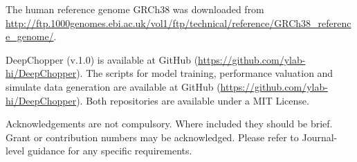 \documentclass[pdflatex, sn-mathphys-num, lineno]{sn-jnl}%
\theoremstyle{thmstyleone}%
\theoremstyle{thmstyletwo}%
\theoremstyle{thmstylethree}%
\begin{document}



The human reference genome GRCh38 was downloaded from \url{http://ftp.1000genomes.ebi.ac.uk/vol1/ftp/technical/reference/GRCh38\_reference\_genome/}.



DeepChopper (v.1.0) is available at GitHub (\url{https://github.com/ylab-hi/DeepChopper}).
The scripts for model training, performance valuation and simulate data generation are available at GitHub (\url{https://github.com/ylab-hi/DeepChopper}).
Both repositories are available under a MIT License.


Acknowledgements are not compulsory. Where included they should be brief. Grant or contribution numbers may be acknowledged.
Please refer to Journal-level guidance for any specific requirements.


\backmatter

\begin{appendices}
    \printglossary[type=\acronymtype, title=Abbreviations]

\end{appendices}
\end{document}
